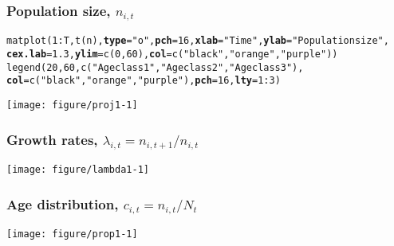 \documentclass[color=usenames,dvipsnames]{beamer}\usepackage[]{graphicx}\usepackage[]{color}
\makeatletter
\newcommand{\hlnum}[1]{\textcolor[rgb]{0.69,0.494,0}{#1}}%
\newcommand{\hlstr}[1]{\textcolor[rgb]{0.749,0.012,0.012}{#1}}%
\newcommand{\hlopt}[1]{\textcolor[rgb]{0,0,0}{#1}}%
\newcommand{\hlstd}[1]{\textcolor[rgb]{0,0,0}{#1}}%
\newcommand{\hlkwc}[1]{\textcolor[rgb]{0,0,0}{\textbf{#1}}}%
\newcommand{\hlkwd}[1]{\textcolor[rgb]{0.004,0.004,0.506}{#1}}%
\newenvironment{kframe}{%
 \def\at@end@of@kframe{}%
 \ifinner\ifhmode%
  \def\at@end@of@kframe{\end{minipage}}%
  \begin{minipage}{\columnwidth}%
 \fi\fi%
 \def\FrameCommand##1{\hskip\@totalleftmargin \hskip-\fboxsep
 \colorbox{shadecolor}{##1}\hskip-\fboxsep
     \hskip-\linewidth \hskip-\@totalleftmargin \hskip\columnwidth}%
 \MakeFramed {\advance\hsize-\width
   \@totalleftmargin\z@ \linewidth\hsize
   \@setminipage}}%
 {\par\unskip\endMakeFramed%
 \at@end@of@kframe}
\newenvironment{knitrout}{}{} %
\makeatother
\begin{document}
\begin{frame}[fragile]
  \frametitle{Population size, $n_{i,t}$}
\begin{knitrout}\scriptsize
{}\color{fgcolor}\begin{kframe}
\begin{alltt}
\hlkwd{matplot}\hlstd{(}\hlnum{1}\hlopt{:}\hlstd{T,} \hlkwd{t}\hlstd{(n),} \hlkwc{type}\hlstd{=}\hlstr{"o"}\hlstd{,} \hlkwc{pch}\hlstd{=}\hlnum{16}\hlstd{,} \hlkwc{xlab}\hlstd{=}\hlstr{"Time"}\hlstd{,} \hlkwc{ylab}\hlstd{=}\hlstr{"Population size"}\hlstd{,}
        \hlkwc{cex.lab}\hlstd{=}\hlnum{1.3}\hlstd{,} \hlkwc{ylim}\hlstd{=}\hlkwd{c}\hlstd{(}\hlnum{0}\hlstd{,} \hlnum{60}\hlstd{),} \hlkwc{col}\hlstd{=}\hlkwd{c}\hlstd{(}\hlstr{"black"}\hlstd{,} \hlstr{"orange"}\hlstd{,} \hlstr{"purple"}\hlstd{))}
\hlkwd{legend}\hlstd{(}\hlnum{20}\hlstd{,} \hlnum{60}\hlstd{,} \hlkwd{c}\hlstd{(}\hlstr{"Age class 1"}\hlstd{,} \hlstr{"Age class 2"}\hlstd{,} \hlstr{"Age class 3"}\hlstd{),}
       \hlkwc{col}\hlstd{=}\hlkwd{c}\hlstd{(}\hlstr{"black"}\hlstd{,} \hlstr{"orange"}\hlstd{,} \hlstr{"purple"}\hlstd{),} \hlkwc{pch}\hlstd{=}\hlnum{16}\hlstd{,} \hlkwc{lty}\hlstd{=}\hlnum{1}\hlopt{:}\hlnum{3}\hlstd{)}
\end{alltt}
\end{kframe}

{\centering \texttt{[image: figure/proj1-1]} 

}



\end{knitrout}
\end{frame}




\begin{frame}[fragile]
  \frametitle{Growth rates, $\lambda_{i,t} = n_{i,t+1}/n_{i,t}$}

\vspace{-0.9cm}
\begin{center}
  \texttt{[image: figure/lambda1-1]}
\end{center}
\end{frame}




\begin{frame}[fragile]
  \frametitle{Age distribution, $c_{i,t} = n_{i,t}/N_t$}

\vspace{-0.9cm}
\begin{center}
  \texttt{[image: figure/prop1-1]}
\end{center}
\end{frame}
\end{document}
